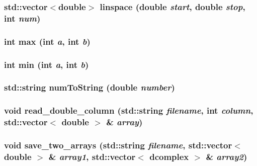 \subsubsection{\setlength{\rightskip}{0pt plus 5cm}std::vector$<$double$>$ linspace (double {\em start}, double {\em stop}, int {\em num})}\label{misc_8cpp_9b8287ed5c1ffa5bf83610988e681466}


\subsubsection{\setlength{\rightskip}{0pt plus 5cm}int max (int {\em a}, int {\em b})}\label{misc_8cpp_a1460da02198e3866d1ce23f0e25daff}


\subsubsection{\setlength{\rightskip}{0pt plus 5cm}int min (int {\em a}, int {\em b})}\label{misc_8cpp_3d94da36be4b94a90216d89313f1a28b}


\subsubsection{\setlength{\rightskip}{0pt plus 5cm}std::string num\-To\-String (double {\em number})}\label{misc_8cpp_be893c15d04d9b74b59a1023727aa99b}


\subsubsection{\setlength{\rightskip}{0pt plus 5cm}void read\_\-double\_\-column (std::string {\em filename}, int {\em column}, std::vector$<$ double $>$ \& {\em array})}\label{misc_8cpp_aa78539eee0bf5b1257992625e626523}


\subsubsection{\setlength{\rightskip}{0pt plus 5cm}void save\_\-two\_\-arrays (std::string {\em filename}, std::vector$<$ double $>$ \& {\em array1}, std::vector$<$ \bf{dcomplex} $>$ \& {\em array2})}\label{misc_8cpp_f5ccf41d6f8d69c8f3ba48f994970c7c}


